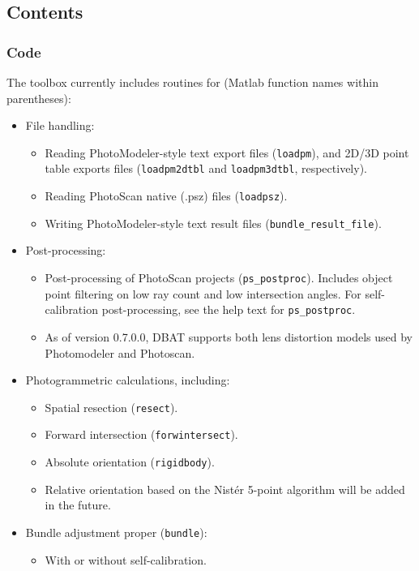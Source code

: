 \documentclass{article}
\begin{document}
\subsection{Contents}

\subsubsection{Code}
The toolbox currently includes routines for (Matlab function names within parentheses):
\begin{itemize}
\item File handling:
  \begin{itemize}
  \item Reading PhotoModeler-style text export files (\texttt{loadpm}), 
    and 2D/3D point table exports files (\texttt{loadpm2dtbl} and
    \texttt{loadpm3dtbl}, respectively).
  \item Reading PhotoScan native (.psz) files (\texttt{loadpsz}).
  \item Writing PhotoModeler-style text result files
    (\texttt{bundle\_result\_file}).
  \end{itemize}
\item Post-processing:
  \begin{itemize}
  \item Post-processing of PhotoScan projects (\texttt{ps\_postproc}).
    Includes object point filtering on low ray count and low
    intersection angles. For self-calibration post-processing,
    see the help text for \texttt{ps\_postproc}.
  \item As of version 0.7.0.0, DBAT supports both lens distortion
    models used by Photomodeler and Photoscan.
  \end{itemize}
\item Photogrammetric calculations, including:
  \begin{itemize}
  \item Spatial resection (\texttt{resect}).
  \item Forward intersection (\texttt{forwintersect}).
  \item Absolute orientation (\texttt{rigidbody}).
  \item Relative orientation based on the Nist{\'e}r 5-point algorithm
    \citep{Stewenius2006:Recent} will be added in the future.
  \end{itemize}
\item Bundle adjustment proper (\texttt{bundle}):
  \begin{itemize}
  \item With or without self-calibration.

\end{itemize}
\end{itemize}
\end{document}
